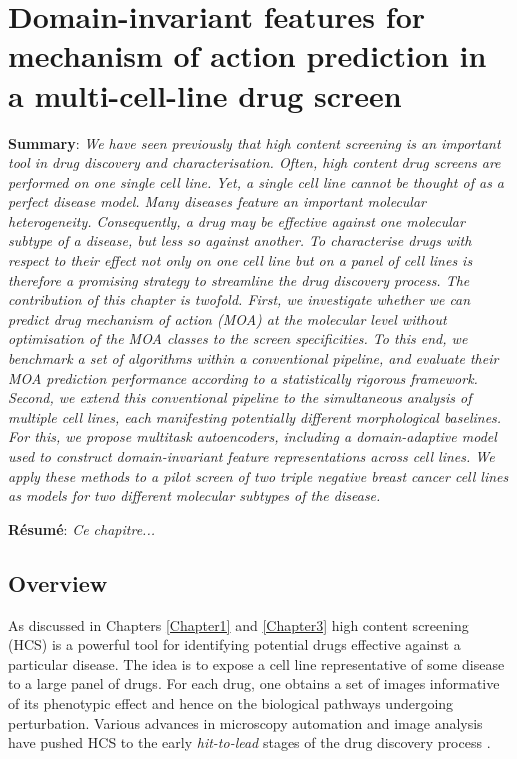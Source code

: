 
\chapter{Domain-invariant features for mechanism of action prediction in a multi-cell-line drug screen} %

\label{Chapter4} %

\textbf{Summary}: \emph{We have seen previously that high content screening is an important tool in drug discovery and characterisation. Often, high content drug screens are performed on one single cell line. Yet, a single cell line cannot be thought of as a perfect disease model. Many diseases feature an important molecular heterogeneity. Consequently, a drug may be effective against one molecular subtype of a disease, but less so against another. To characterise drugs with respect to their effect not only on one cell line but on a panel of cell lines is therefore a promising strategy to streamline the drug discovery process. The contribution of this chapter is twofold. First, we investigate whether we can predict drug mechanism of action (MOA) at the molecular level without optimisation of the MOA classes to the screen specificities. To this end, we benchmark a set of algorithms within a conventional pipeline, and evaluate their MOA prediction performance according to a statistically rigorous framework. Second, we extend this conventional pipeline to the simultaneous analysis of multiple cell lines, each manifesting potentially different morphological baselines. For this, we propose multitask autoencoders, including a domain-adaptive model used to construct domain-invariant feature representations across cell lines. We apply these methods to a pilot screen of two triple negative breast cancer cell lines as models for two different molecular subtypes of the disease.}

\textbf{R\'esum\'e}: \emph{Ce chapitre...}

\section{Overview}
As discussed in Chapters \ref{Chapter1} and \ref{Chapter3} high content screening (HCS) is a powerful tool for identifying potential drugs effective against a particular disease. The idea is to expose a cell line representative of some disease to a large panel of drugs. For each drug, one obtains a set of images informative of its phenotypic effect and hence on the biological pathways undergoing perturbation. Various advances in microscopy automation and image analysis have pushed HCS to the early \emph{hit-to-lead} stages of the drug discovery process \cite{haney2006high}.

